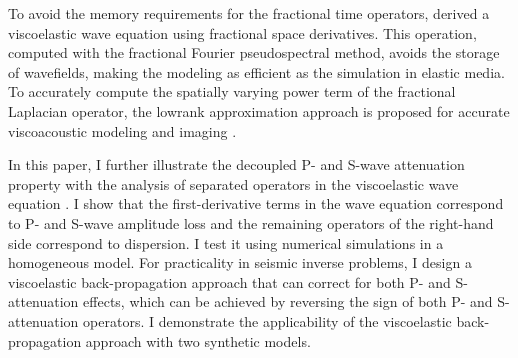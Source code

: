 To avoid the memory requirements for the fractional time operators, \citet[]{zhu14c} derived a viscoelastic wave equation using fractional space derivatives. This operation, computed with the fractional Fourier pseudospectral method, avoids the storage of wavefields, making the modeling as efficient as the simulation in elastic media. To accurately compute the spatially varying power term of the fractional Laplacian operator, the lowrank approximation approach \citep{lowrank} is proposed for accurate viscoacoustic modeling and imaging \citep{sun14b}.

In this paper, I further illustrate the decoupled P- and S-wave attenuation property with the analysis of separated operators in the viscoelastic wave equation \cite[]{zhu14c}. I show that the first-derivative terms in the wave equation correspond to P- and S-wave amplitude loss and the remaining operators of the right-hand side correspond to dispersion. I test it using numerical simulations in a homogeneous model. For practicality in seismic inverse problems, I design a viscoelastic back-propagation approach that can correct for both P- and S-attenuation effects, which can be achieved by reversing the sign of both P- and S-attenuation operators. I demonstrate the applicability of the viscoelastic back-propagation approach with two synthetic models. 

